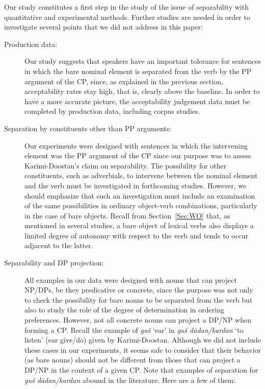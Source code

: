 \documentclass[output=paper]{langsci/langscibook}
\begin{document}
Our study constitutes a first step in the study of the issue of separability with quantitative and experimental methods. Further studies are needed in order to investigate several points that we did not address in this paper: 

\begin{description}
\item[Production data:] Our study suggests that speakers have an important tolerance for sentences in which the bare nominal element is separated from the verb by the PP argument of the CP, since, as explained in the previous section, acceptability rates stay high, that is, clearly above the baseline. In order to have a more accurate picture, the acceptability judgement data must be completed by production data, including corpus studies. 

\item[Separation by constituents other than PP arguments:]
  \begin{sloppypar}
    Our experiments were designed with sentences in which the
    intervening element was the PP argument of the CP since our
    purpose was to assess Karimi-Doostan's claim on separability. The
    possibility for other constituents, such as adverbials, to
    intervene between the nominal element and the verb must be
    investigated in forthcoming studies. However, we should emphasize
    that such an investigation must include an examination of the same
    possibilities in ordinary object-verb combinations, particularly
    in the case of bare objects. Recall from Section~\ref{Sec:WO}
    that, as mentioned in several studies, a bare object of lexical
    verbs also displays a limited degree of autonomy with respect to
    the verb and tends to occur adjacent to the latter.
  \end{sloppypar}
\item[Separability and DP projection:]
  \begin{sloppypar}
    All examples in our data were designed with nouns that can project
    NP/DPs, be they predicative or concrete, since the purpose was not
    only to check the possibility for bare nouns to be separated from
    the verb but also to study the role of the degree of determination
    in ordering preferences. However, not all concrete nouns can
    project a DP/NP when forming a CP. Recall the example of
    \textit{gu\v{s}} `ear' in \textit{gu\v{s} d\=adan/kardan} `to
    listen' (ear give/do) given by Karimi-Doostan. Although we did not
    include these cases in our experiments, it seems safe to consider
    that their behavior (as bare nouns) should not be different from
    those that can project a DP/NP in the context of a given CP. Note
    that examples of separation for \textit{gu\v{s} d\=adan/kardan}
    abound in the literature. Here are a few of them:
  \end{sloppypar}


\end{description}
\end{document}
